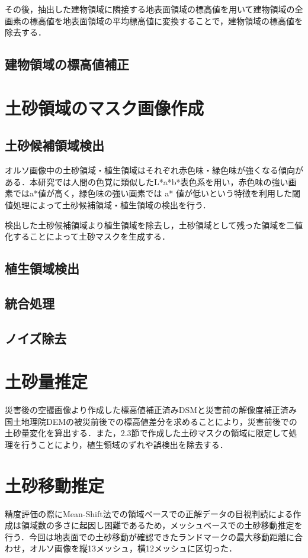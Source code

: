       その後，抽出した建物領域に隣接する地表面領域の標高値を用いて建物領域の全画素の標高値を地表面領域の平均標高値に変換することで，建物領域の標高値を除去する．

    \subsection{建物領域の標高値補正}

  
  \section{土砂領域のマスク画像作成}
    \subsection{土砂候補領域検出}
      オルソ画像中の土砂領域・植生領域はそれぞれ赤色味・緑色味が強くなる傾向がある．本研究では人間の色覚に類似したL*a*b*表色系を用い，赤色味の強い画素ではa*値が高く，緑色味の強い画素では a* 値が低いという特徴を利用した閾値処理によって土砂候補領域・植生領域の検出を行う．
      
      検出した土砂候補領域より植生領域を除去し，土砂領域として残った領域を二値化することによって土砂マスクを生成する．
  
    \subsection{植生領域検出}
    \subsection{統合処理}
    \subsection{ノイズ除去}

  
  \section{土砂量推定}
    災害後の空撮画像より作成した標高値補正済みDSMと災害前の解像度補正済み国土地理院DEMの被災前後での標高値差分を求めることにより，災害前後での土砂量変化を算出する．また，2.3節で作成した土砂マスクの領域に限定して処理を行うことにより，植生領域のずれや誤検出を除去する．
  
  \section{土砂移動推定}
    精度評価の際にMean-Shift法での領域ベースでの正解データの目視判読による作成は領域数の多さに起因し困難であるため，メッシュベースでの土砂移動推定を行う．今回は地表面での土砂移動が確認できたランドマークの最大移動距離に合わせ，オルソ画像を縦13メッシュ，横12メッシュに区切った．

